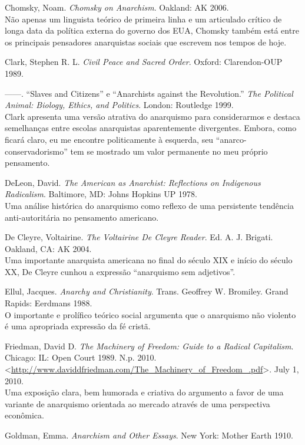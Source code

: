 \begin{hangparas}{0.25in}{1}
Chomsky, Noam. \emph{Chomsky on Anarchism}. Oakland: AK 2006.\smallskip\\
Não apenas um linguista teórico de primeira linha e um articulado crítico de longa data da política externa do governo dos EUA, Chomsky também está entre os principais pensadores anarquistas sociais que escrevem nos tempos de hoje.

Clark, Stephen R. L. \emph{Civil Peace and Sacred Order}. Oxford: Clarendon-OUP 1989.

------. ``Slaves and Citizens'' e ``Anarchists against the Revolution.'' \emph{The Political Animal: Biology, Ethics, and Politics}. London: Routledge 1999.\smallskip\\
Clark apresenta uma versão atrativa do anarquismo para considerarmos e destaca semelhanças entre escolas anarquistas aparentemente divergentes. Embora, como ficará claro, eu me encontre politicamente à esquerda, seu ``anarco-conservadorismo'' tem se mostrado um valor permanente no meu próprio pensamento.

DeLeon, David. \emph{The American as Anarchist: Reflections on Indigenous Radicalism}. Baltimore, MD: Johns Hopkins UP 1978.\smallskip\\
Uma análise histórica do anarquismo como reflexo de uma persistente tendência anti-autoritária no pensamento americano.

De Cleyre, Voltairine. \emph{The Voltairine De Cleyre Reader}. Ed. A. J. Brigati. Oakland, CA: AK 2004.\smallskip\\
Uma importante anarquista americana no final do século XIX e início do século XX, De Cleyre cunhou a expressão ``anarquismo sem adjetivos''.

Ellul, Jacques. \emph{Anarchy and Christianity}. Trans. Geoffrey W. Bromiley. Grand Rapids: Eerdmans 1988.\smallskip\\
O importante e prolífico teórico social argumenta que o anarquismo não violento é uma apropriada expressão da fé cristã.

Friedman, David D. \emph{The Machinery of Freedom: Guide to a Radical Capitalism}. Chicago: IL: Open Court 1989. N.p. 2010. <\url{http://www.daviddfriedman.com/The_Machinery_of_Freedom_.pdf}>. July 1, 2010.\smallskip\\
Uma exposição clara, bem humorada e criativa do argumento a favor de uma variante de anarquismo orientada ao mercado através de uma perspectiva econômica.

Goldman, Emma. \emph{Anarchism and Other Essays}. New York: Mother Earth 1910.


\end{hangparas}
